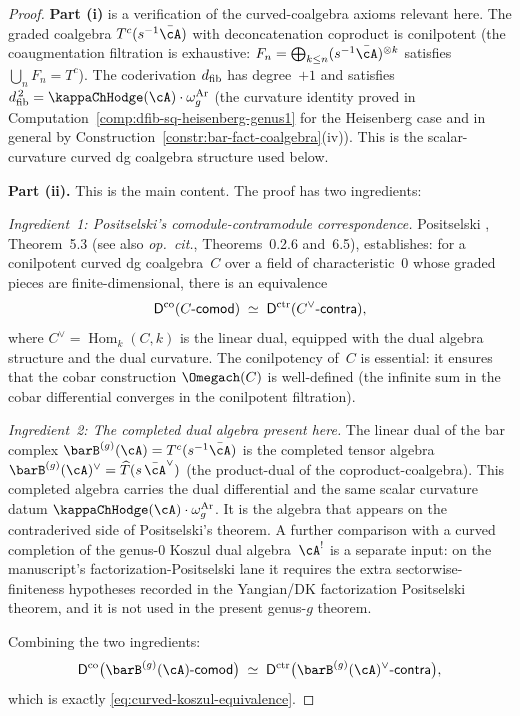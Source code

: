 \begin{proof}
\textbf{Part (i)} is a verification of the curved-coalgebra axioms
relevant here. The
graded coalgebra $T^c(s^{-1}\bar\cA)$ with deconcatenation
coproduct is conilpotent (the coaugmentation filtration is
exhaustive: $F_n = \bigoplus_{k \leq n} (s^{-1}\bar\cA)^{\otimes k}$
satisfies $\bigcup_n F_n = T^c$). The coderivation $d_{\mathrm{fib}}$ has
degree~$+1$ and satisfies $\dfib^{\,2} = \kappaChHodge(\cA) \cdot \omega_g^{\mathrm{Ar}}$
(the curvature identity proved in
Computation~\ref{comp:dfib-sq-heisenberg-genus1} for the
Heisenberg case and in general by
Construction~\ref{constr:bar-fact-coalgebra}(iv)). This is the
scalar-curvature curved dg coalgebra structure used below.

\smallskip\noindent
\textbf{Part (ii).} This is the main content. The proof has
two ingredients:

\smallskip\noindent
\emph{Ingredient~1: Positselski's comodule-contramodule
correspondence.}
Positselski \cite{Pos11}, Theorem~5.3 (see also
\emph{op.\ cit.}, Theorems~0.2.6 and~6.5), establishes:
for a conilpotent curved dg coalgebra~$C$ over a field of
characteristic~$0$ whose graded pieces are finite-dimensional,
there is an equivalence
\[
 \mathsf{D}^{\mathrm{co}}(C\text{-}\mathsf{comod})
 \;\simeq\;
 \mathsf{D}^{\mathrm{ctr}}(C^\vee\text{-}\mathsf{contra}),
\]
where $C^\vee = \operatorname{Hom}_k(C, k)$ is the linear dual,
equipped with the dual algebra structure and the dual curvature.
The conilpotency of~$C$ is essential: it ensures that the cobar
construction $\Omegach(C)$ is well-defined (the infinite sum in
the cobar differential converges in the conilpotent filtration).

\smallskip\noindent
\emph{Ingredient~2: The completed dual algebra present here.}
The linear dual of the bar complex $\barB^{(g)}(\cA) =
T^c(s^{-1}\bar\cA)$ is the completed tensor algebra
$\barB^{(g)}(\cA)^\vee = \widehat{T}(s\,\bar\cA^\vee)$
(the product-dual of the coproduct-coalgebra). This completed
algebra carries the dual differential and the same scalar
curvature datum $\kappaChHodge(\cA) \cdot \omega_g^{\mathrm{Ar}}$. It is the algebra that
appears on the contraderived side of Positselski's theorem. A
further comparison with a curved completion of the genus-$0$
Koszul dual algebra~$\cA^!$ is a separate input: on the
manuscript's factorization-Positselski lane it requires the extra
sectorwise-finiteness hypotheses recorded in the Yangian/DK
factorization Positselski theorem, and it is not used in the
present genus-$g$ theorem.

Combining the two ingredients:
\[
 \Dco\bigl(\barB^{(g)}(\cA)\text{-}\mathsf{comod}\bigr)
 \;\simeq\;
 \Dctr\bigl(\barB^{(g)}(\cA)^\vee\text{-}\mathsf{contra}\bigr),
\]
which is exactly \eqref{eq:curved-koszul-equivalence}.


\end{proof}
